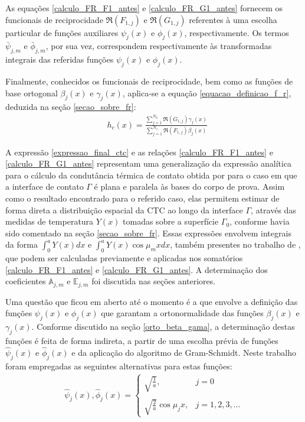 As equações \eqref{calculo_FR_F1_antes} e \eqref{calculo_FR_G1_antes} fornecem os funcionais de reciprocidade $\Re(F_{1,j})$ e $\Re(G_{1,j})$ referentes à uma escolha particular de funções auxiliares $\psi_j(x)$ e $\phi_j(x)$, respectivamente. Os termos $\bar{\psi}_{j, m}$ e $\bar{\phi}_{j, m}$, por sua vez, correspondem respectivamente às transformadas integrais das referidas funções $\psi_j(x)$ e $\phi_j(x)$. 

Finalmente, conhecidos os funcionais de reciprocidade, bem como as funções de base ortogonal $\beta_j(x)$ e $\gamma_j(x)$, aplica-se a equação \eqref{equacao_definicao_f_r}, deduzida na seção \ref{secao_sobre_fr}:
\begin{align}
& h_c(x) %
= \frac{\displaystyle\sum_{j=1}^{N_2} \Re(G_{1,j}) \gamma_j(x)}{\displaystyle\sum_{j=1}^{N_1} \Re(F_{1,j}) \beta_j(x)} \label{expressao_final_ctc}
\end{align}

A expressão \eqref{expressao_final_ctc} e as relações \eqref{calculo_FR_F1_antes} e \eqref{calculo_FR_G1_antes} representam uma generalização da expressão analítica para o cálculo da condutância térmica de contato obtida por \cite{tese_padilha} para o caso em que a interface de contato $\Gamma$ é plana e paralela às bases do corpo de prova. Assim como o resultado encontrado para o referido caso, elas permitem estimar de forma direta a distribuição espacial da CTC ao longo da interface $\Gamma$, através das medidas de temperatura $Y(x)$ tomadas sobre a superfície $\Gamma_0$, conforme havia sido comentado na seção \ref{secao_sobre_fr}. Essas expressões envolvem integrais da forma $\displaystyle \int_0^a Y(x)dx$ e $\displaystyle \int_0^a Y(x)\cos\mu_m x dx$, também presentes no trabalho de \cite{tese_padilha}, que podem ser calculadas previamente e aplicadas nos somatórios \eqref{calculo_FR_F1_antes} e \eqref{calculo_FR_G1_antes}. A determinação dos coeficientes $\mathbb{A}_{j,m}$ e $\mathbb{E}_{j,m}$ foi discutida nas seções anteriores.

Uma questão que ficou em aberto até o momento é a que envolve a definição das funções $\psi_j(x)$ e $\phi_j(x)$ que garantam a ortonormalidade das funções $\beta_j(x)$ e $\gamma_j(x)$. Conforme discutido na seção \ref{orto_beta_gama}, a determinação destas funções é feita de forma indireta, a partir de uma escolha prévia de funções $\hat{\psi}_j(x)$ e $\hat{\phi}_j(x)$ e da aplicação do algoritmo de Gram-Schmidt. Neste trabalho foram empregadas as seguintes alternativas para estas funções:
\begin{align}
\hat{\psi}_j(x), \hat{\phi}_j(x) = \left\lbrace
\begin{array}{ll}
\displaystyle\sqrt{\frac{1}{a}}, & j = 0 \\ \nonumber \\
\displaystyle\sqrt{\frac{2}{a}}\cos \mu_j x, & j = 1,2,3,\ldots
\end{array}
\right.
\end{align} 

